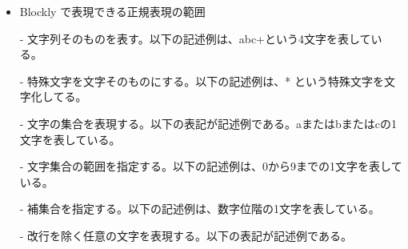 \documentclass{risepaper}
\begin{document}
\begin{itemize}

\item Blockly で表現できる正規表現の範囲

- 文字列そのものを表す。以下の記述例は、abc+という4文字を表している。


- 特殊文字を文字そのものにする。以下の記述例は、* という特殊文字を文字化してる。

\shadowbox{
\begin{minipage}[t]{3cm}
\begin{verbatim}
\*
\end{verbatim}
\end{minipage}
}

- 文字の集合を表現する。以下の表記が記述例である。aまたはbまたはcの1文字を表している。

\shadowbox{
\begin{minipage}[t]{3cm}
\begin{verbatim}
[abc]
\end{verbatim}
\end{minipage}
}

- 文字集合の範囲を指定する。以下の記述例は、0から9までの1文字を表している。

\shadowbox{
\begin{minipage}[t]{3cm}
\begin{verbatim}
[0-9]
\end{verbatim}
\end{minipage}
}

- 補集合を指定する。以下の記述例は、数字位階の1文字を表している。

\shadowbox{
\begin{minipage}[t]{3cm}
\begin{verbatim}
[^0-9]
\end{verbatim}
\end{minipage}
}

- 改行を除く任意の文字を表現する。以下の表記が記述例である。



\end{itemize}
\end{document}
